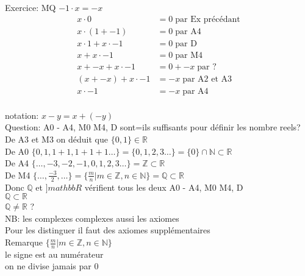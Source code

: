 \documentclass{article}
\begin{document}
Exercice: MQ $-1 \cdot x = -x$ \\

\begin{equation}
\begin{aligned}
    x \cdot 0 &= 0 \; \textrm{par Ex précédant} \\
    x \cdot (1 + -1) &= 0 \; \textrm{par A4} \\
    x \cdot 1 + x \cdot -1 &= 0 \; \textrm{par D} \\
    x + x \cdot -1 &= 0 \; \textrm{par M4} \\
    x + -x + x \cdot -1 &= 0 + -x \; \textrm{par ?} \\
    (x + -x) + x \cdot -1 &= -x \; \textrm{par A2 et A3} \\
    x \cdot -1 &= -x \; \textrm{par A4} \\
\end{aligned}
\end{equation}

notation: $x - y = x + (-y)$\\
Question: A0 - A4, M0 M4, D sont=ils suffisants pour définir les nombre reels?\\
De A3 et M3 on déduit que $\{0, 1\} \in \mathbb{R}$\\
De A0 $\{0, 1, 1 + 1, 1 + 1 + 1 \ldots\} = \{0, 1, 2, 3 \ldots\} = \{0\} \cap \mathbb{N} \subset \mathbb{R}$ \\
De A4 $\{\ldots, -3, -2, -1, 0, 1, 2, 3 \ldots\} = \mathbb{Z} \subset \mathbb{R}$ \\ 
De M4 $\{\ldots, \frac{-3}{2}, \ldots\} = \{ \frac{m}{n} | m \in \mathbb{Z} , n \in \mathbb{N} \} = \mathbb{Q} \subset \mathbb{R}$ \\ 

Donc $\mathbb{Q}$  et $]mathbb{R}$ vérifient tous les deux A0 - A4, M0 M4, D \\
$\mathbb{Q} \subset \mathbb{R}$\\
$\mathbb{Q} \ne \mathbb{R}$ ?\\

NB: les complexes complexes aussi les axiomes \\

Pour les distinguer il faut des axiomes supplémentaires \\

Remarque  $\{ \frac{m}{n} | m \in \mathbb{Z} , n \in \mathbb{N} \}$ \\
le signe  est au numérateur\\
on ne divise jamais par 0\\
\end{document}
